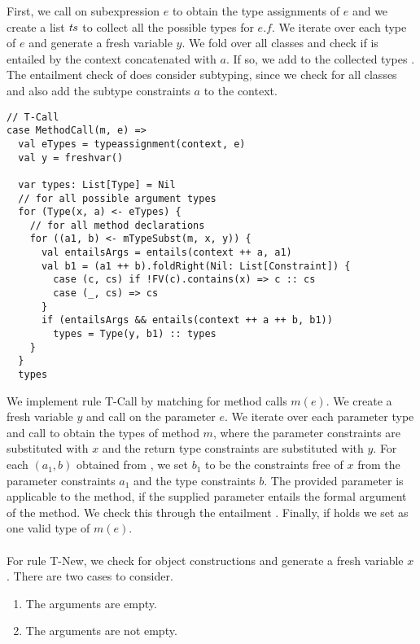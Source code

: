 First, we call  on subexpression $e$ to obtain
the type assignments of $e$ and we create a list $\mathit{ts}$ to collect
all the possible types for $e.f$.
We iterate over each type  of $e$ and generate a fresh variable $y$.
We fold over all classes  and check if 
is entailed by the context concatenated with $a$.
If so, we add  to the collected types .
The entailment check of  does consider subtyping,
since we check for all classes and also add the subtype constraints $a$
to the context.\\
%
\begin{lstlisting}[caption={Case T-Call},label=lst:scala-typeass-call,captionpos=b,frame={lines}]
// T-Call
case MethodCall(m, e) =>
  val eTypes = typeassignment(context, e)
  val y = freshvar()

  var types: List[Type] = Nil
  // for all possible argument types
  for (Type(x, a) <- eTypes) {
    // for all method declarations
    for ((a1, b) <- mTypeSubst(m, x, y)) {
      val entailsArgs = entails(context ++ a, a1)
      val b1 = (a1 ++ b).foldRight(Nil: List[Constraint]) {
        case (c, cs) if !FV(c).contains(x) => c :: cs
        case (_, cs) => cs
      }
      if (entailsArgs && entails(context ++ a ++ b, b1))
        types = Type(y, b1) :: types
    }
  }
  types
\end{lstlisting}
%
We implement rule T-Call by matching for method calls $m(e)$.
We create a fresh variable $y$
and call  on the parameter $e$.
We iterate over each parameter type 
and call  to obtain
the types of method $m$,
where the parameter constraints are substituted with $x$
and the return type constraints are substituted with $y$.
For each $(a_1, b)$ obtained from ,
we set $b_1$ to be the constraints free of $x$
from the parameter constraints $a_1$
and the type constraints $b$.
The provided parameter is applicable to the method,
if the supplied parameter entails the formal argument of the method.
We check this through the entailment .
Finally, if  holds
we set  as one valid type of $m(e)$.\\
\\
For rule T-New, we check for object constructions 
and generate a fresh variable $x$.
There are two cases to consider.
%
\begin{enumerate}
  \item The arguments are empty.
  \item The arguments are not empty.
\end{enumerate}
